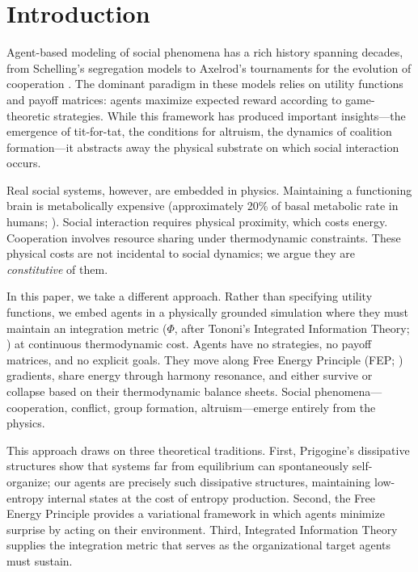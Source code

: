 \documentclass[12pt,a4paper]{article}
\begin{document}
\section{Introduction}
\label{sec:introduction}

Agent-based modeling of social phenomena has a rich history spanning decades, from Schelling's segregation models \citep{schelling1978} to Axelrod's tournaments for the evolution of cooperation \citep{axelrod1984}. The dominant paradigm in these models relies on utility functions and payoff matrices: agents maximize expected reward according to game-theoretic strategies. While this framework has produced important insights---the emergence of tit-for-tat, the conditions for altruism, the dynamics of coalition formation---it abstracts away the physical substrate on which social interaction occurs.

Real social systems, however, are embedded in physics. Maintaining a functioning brain is metabolically expensive (approximately 20\% of basal metabolic rate in humans; \citealt{raichle2002}). Social interaction requires physical proximity, which costs energy. Cooperation involves resource sharing under thermodynamic constraints. These physical costs are not incidental to social dynamics; we argue they are \emph{constitutive} of them.

In this paper, we take a different approach. Rather than specifying utility functions, we embed agents in a physically grounded simulation where they must maintain an integration metric ($\Phi$, after Tononi's Integrated Information Theory; \citealt{tononi2004}) at continuous thermodynamic cost. Agents have no strategies, no payoff matrices, and no explicit goals. They move along Free Energy Principle (FEP; \citealt{friston2010}) gradients, share energy through harmony resonance, and either survive or collapse based on their thermodynamic balance sheets. Social phenomena---cooperation, conflict, group formation, altruism---emerge entirely from the physics.

This approach draws on three theoretical traditions. First, Prigogine's dissipative structures \citep{prigogine1977} show that systems far from equilibrium can spontaneously self-organize; our agents are precisely such dissipative structures, maintaining low-entropy internal states at the cost of entropy production. Second, the Free Energy Principle \citep{friston2010} provides a variational framework in which agents minimize surprise by acting on their environment. Third, Integrated Information Theory \citep{tononi2004} supplies the integration metric that serves as the organizational target agents must sustain.
\end{document}
